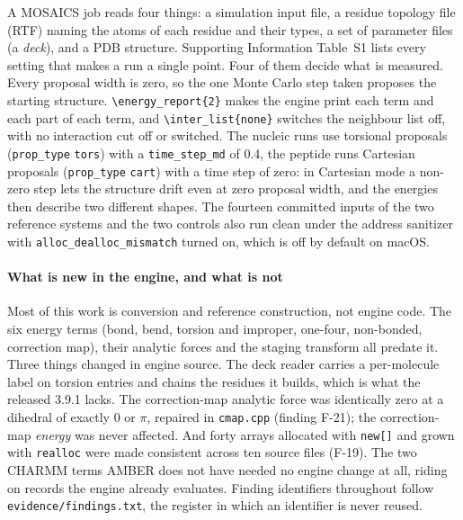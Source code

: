 A MOSAICS job reads four things: a simulation input file, a residue topology
file (RTF) naming the atoms of each residue and their types, a set of parameter
files (a \emph{deck}), and a PDB structure. Supporting Information Table~S1
lists every setting that makes a run a single point. Four of them decide what
is measured. Every proposal width is zero, so the one Monte Carlo step taken
proposes the starting structure. \verb|\energy_report{2}| makes the engine
print each term and each part of each term, and \verb|\inter_list{none}|
switches the neighbour list off, with no interaction cut off or switched. The
nucleic runs use torsional proposals (\texttt{prop\_type} \texttt{tors}) with a
\texttt{time\_step\_md} of 0.4, the peptide runs Cartesian proposals
(\texttt{prop\_type} \texttt{cart}) with a time step of zero: in Cartesian mode a
non-zero step lets the structure drift even at zero proposal width, and the
energies then describe two different shapes. The fourteen
committed inputs of the two reference systems and the two controls also run
clean under the address sanitizer with \texttt{alloc\_dealloc\_mismatch} turned
on, which is off by default on macOS.

\paragraph{What is new in the engine, and what is not}
Most of this work is conversion and reference construction, not engine code.
The six energy terms (bond, bend, torsion and improper, one-four, non-bonded,
correction map), their analytic forces and the staging transform all predate
it. Three things changed in engine source. The deck reader carries a
per-molecule label on torsion entries and chains the residues it builds, which
is what the released 3.9.1 lacks. The correction-map analytic force was
identically zero at a dihedral of exactly $0$ or $\pi$, repaired in
\texttt{cmap.cpp} (finding F-21); the correction-map \emph{energy} was never
affected. And forty arrays allocated with \texttt{new[]} and grown with
\texttt{realloc} were made consistent across ten source files (F-19). The two
CHARMM terms AMBER does not have needed no engine change at all, riding on
records the engine already evaluates. Finding identifiers throughout follow
\texttt{evidence/findings.txt}, the register in which an identifier is never
reused.

